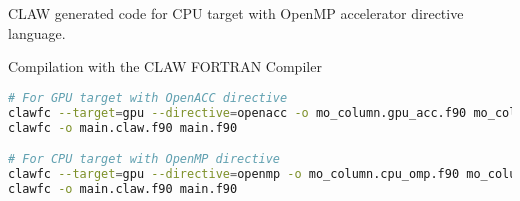 CLAW generated code for CPU target with OpenMP accelerator directive language.


Compilation with the CLAW FORTRAN Compiler
\begin{lstlisting}[language=bash]
# For GPU target with OpenACC directive
clawfc --target=gpu --directive=openacc -o mo_column.gpu_acc.f90 mo_column.f90
clawfc -o main.claw.f90 main.f90

# For CPU target with OpenMP directive
clawfc --target=gpu --directive=openmp -o mo_column.cpu_omp.f90 mo_column.f90
clawfc -o main.claw.f90 main.f90
\end{lstlisting}
